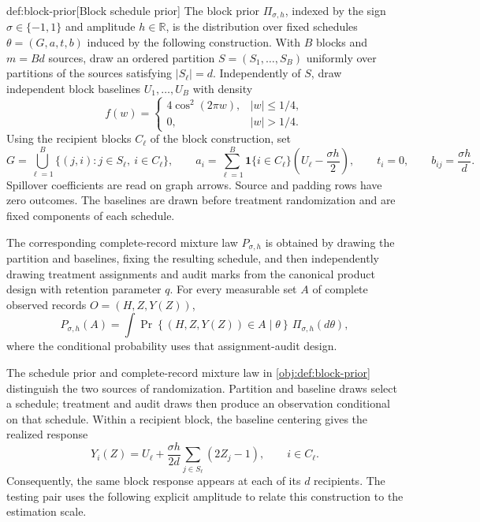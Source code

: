 \documentclass[11pt]{article}
\begin{document}
\begin{definitionv}{def:block-prior}[Block schedule prior]
The block prior \(\Pi_{\sigma,h}\), indexed by the sign \(\sigma\in\{-1,1\}\) and amplitude \(h\in\mathbb R\), is the distribution over fixed schedules \(\theta=(G,a,t,b)\) induced by the following construction. With \(B\) blocks and \(m=Bd\) sources, draw an ordered partition \(S=(S_1,\ldots,S_B)\) uniformly over partitions of the sources satisfying \(|S_\ell|=d\). Independently of \(S\), draw independent block baselines \(U_1,\ldots,U_B\) with density
\[
f(w)=
\begin{cases}
4\cos^2(2\pi w),& |w|\le 1/4,\\
0,& |w|>1/4.
\end{cases}
\]
Using the recipient blocks \(C_\ell\) of the block construction, set
\[
G=\bigcup_{\ell=1}^{B}\{(j,i):j\in S_\ell,\ i\in C_\ell\},
\qquad
a_i=\sum_{\ell=1}^{B}\mathbf1\{i\in C_\ell\}
       \left(U_\ell-\frac{\sigma h}{2}\right),
\qquad
t_i=0,
\qquad
b_{ij}=\frac{\sigma h}{d}.
\]
Spillover coefficients are read on graph arrows. Source and padding rows have zero outcomes. The baselines are drawn before treatment randomization and are fixed components of each schedule.

The corresponding complete-record mixture law \(P_{\sigma,h}\) is obtained by drawing the partition and baselines, fixing the resulting schedule, and then independently drawing treatment assignments and audit marks from the canonical product design with retention parameter \(q\). For every measurable set \(A\) of complete observed records \(O=(H,Z,Y(Z))\),
\[
P_{\sigma,h}(A)
=
\int
\Pr\!\left\{(H,Z,Y(Z))\in A\mid\theta\right\}
\,\Pi_{\sigma,h}(d\theta),
\]
where the conditional probability uses that assignment-audit design.
\end{definitionv}

The schedule prior  and complete-record mixture law  in \cref{obj:def:block-prior} distinguish the two sources of randomization. Partition and baseline draws select a schedule; treatment and audit draws then produce an observation conditional on that schedule. Within a recipient block, the baseline centering gives the realized response
\[
Y_i(Z)
=
U_\ell+\frac{\sigma h}{2d}\sum_{j\in S_\ell}(2Z_j-1),
\qquad i\in C_\ell.
\]
Consequently, the same block response appears at each of its \(d\) recipients. The testing pair uses the following explicit amplitude to relate this construction to the estimation scale.
\end{document}
